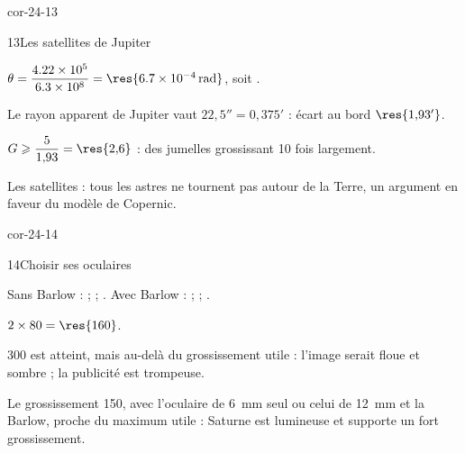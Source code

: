 \begin{blocLivre}{cor-24-13}
\begin{corrige}{13}{Les satellites de Jupiter}
\begin{questions}
\item $\theta=\dfrac{\num{4.22e5}}{\num{6.3e8}}=\res{\qty{6,7e-4}{rad}}$, soit .
\item Le rayon apparent de Jupiter vaut $22{,}5''=0{,}375'$ : écart au bord $\res{1{,}93'}$.
\item $G\geqslant\dfrac{5}{1{,}93}=\res{2{,}6}$ : des jumelles grossissant 10 fois  largement.
\item Les satellites  : tous les astres ne tournent pas autour de la Terre, un argument en
faveur du modèle de Copernic.
\end{questions}
\end{corrige}
\end{blocLivre}
\begin{blocLivre}{cor-24-14}
\begin{corrige}{14}{Choisir ses oculaires}
\begin{questions}
\item Sans Barlow :  ;  ; . Avec Barlow :  ;  ; .
\item $2\times80=\res{160}$.
\item 300 est atteint, mais  au-delà du grossissement utile : l'image serait floue et sombre ; la
publicité est trompeuse.
\item Le grossissement 150, avec l'oculaire de \qty{6}{mm} seul ou celui de \qty{12}{mm} et la Barlow, proche du maximum
utile : Saturne est lumineuse et supporte un fort grossissement.
\end{questions}
\end{corrige}
\end{blocLivre}
